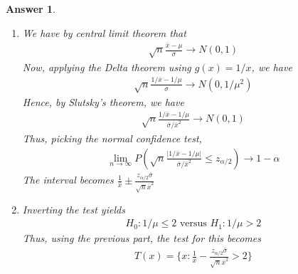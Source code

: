 \documentclass[12pt]{article}
\theoremstyle{colon}
\newtheorem*{answer}{Answer}
\begin{document}
\begin{answer}
  \leavevmode
  \begin{enumerate}[label=\arabic*)]
    \item We have by central limit theorem that
      \begin{gather*}
        \sqrt{n} \frac{\bar{x} - \mu}{\sigma} \rightarrow N(0,1)
      \end{gather*}
      Now, applying the Delta theorem using $g(x) = 1/x$, we have
      \begin{gather*}
        \sqrt{n} \frac{1/\bar{x} - 1/\mu}{\sigma} \rightarrow N(0,1/\mu^2)
      \end{gather*}
      Hence, by Slutsky's theorem, we have
      \begin{gather*}
        \sqrt{n} \frac{1/\bar{x} - 1/\mu}{\bar{\sigma}/\bar{x}^2} \rightarrow N(0,1)
      \end{gather*}
      Thus, picking the normal confidence test,
      \begin{gather*}
        \lim_{n \rightarrow \infty} P \left( \sqrt{n} \frac{\lvert 1/\bar{x} - 1/\mu \rvert}{\bar{\sigma}/\bar{x}^2} \leq z_{\alpha/2} \right) \rightarrow 1 - \alpha
      \end{gather*}
      The interval becomes $\frac{1}{\bar{x}} \pm \frac{z_{\alpha/2} \bar{\sigma}}{\sqrt{n} \bar{x}^2}$
    \item Inverting the test yields
      \begin{gather*}
        H_0 : 1/\mu \leq 2 \text{ versus } H_1 : 1/\mu > 2
      \end{gather*}
      Thus, using the previous part, the test for this becomes
      \begin{gather*}
        T(x) = \{ x : \frac{1}{\bar{x}} - \frac{z_{\alpha/2} \bar{\sigma}}{\sqrt{n} \bar{x}^2} > 2 \}
      \end{gather*}
  \end{enumerate}
\end{answer}

\clearpage
\end{document}
